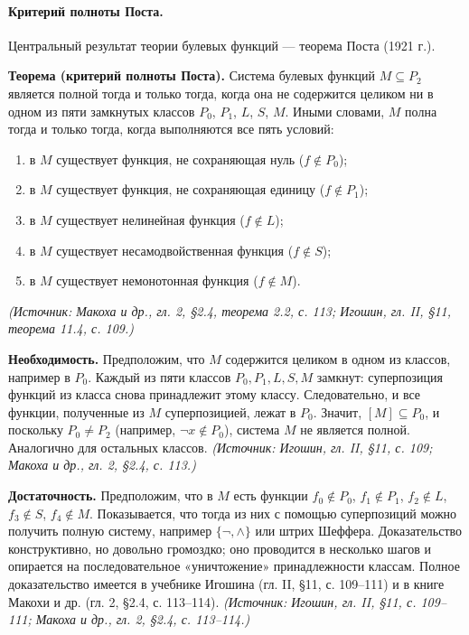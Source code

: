 \documentclass[a4paper,12pt]{article}
\begin{document}
\paragraph{Критерий полноты Поста.}
Центральный результат теории булевых функций — теорема Поста (1921 г.).

\textbf{Теорема (критерий полноты Поста).} Система булевых функций \(M\subseteq P_2\) является полной тогда и только тогда, когда она не содержится целиком ни в одном из пяти замкнутых классов \(P_0\), \(P_1\), \(L\), \(S\), \(M\). Иными словами, \(M\) полна тогда и только тогда, когда выполняются все пять условий:
\begin{enumerate}[label=\arabic*)]
\item в \(M\) существует функция, не сохраняющая нуль (\(f\notin P_0\));
\item в \(M\) существует функция, не сохраняющая единицу (\(f\notin P_1\));
\item в \(M\) существует нелинейная функция (\(f\notin L\));
\item в \(M\) существует несамодвойственная функция (\(f\notin S\));
\item в \(M\) существует немонотонная функция (\(f\notin M\)).
\end{enumerate}
\textit{(Источник: Макоха и др., гл. 2, §2.4, теорема 2.2, с. 113; Игошин, гл. II, §11, теорема 11.4, с. 109.)}

\textbf{Необходимость.} Предположим, что \(M\) содержится целиком в одном из классов, например в \(P_0\). Каждый из пяти классов \(P_0,P_1,L,S,M\) замкнут: суперпозиция функций из класса снова принадлежит этому классу. Следовательно, и все функции, полученные из \(M\) суперпозицией, лежат в \(P_0\). Значит, \([M]\subseteq P_0\), и поскольку \(P_0\ne P_2\) (например, \(\neg x\notin P_0\)), система \(M\) не является полной. Аналогично для остальных классов.
\textit{(Источник: Игошин, гл. II, §11, с. 109; Макоха и др., гл. 2, §2.4, с. 113.)}

\textbf{Достаточность.} Предположим, что в \(M\) есть функции \(f_0\notin P_0\), \(f_1\notin P_1\), \(f_2\notin L\), \(f_3\notin S\), \(f_4\notin M\). Показывается, что тогда из них с помощью суперпозиций можно получить полную систему, например \(\{\neg,\land\}\) или штрих Шеффера. Доказательство конструктивно, но довольно громоздко; оно проводится в несколько шагов и опирается на последовательное «уничтожение» принадлежности классам. Полное доказательство имеется в учебнике Игошина (гл. II, §11, с. 109--111) и в книге Макохи и др. (гл. 2, §2.4, с. 113--114).
\textit{(Источник: Игошин, гл. II, §11, с. 109--111; Макоха и др., гл. 2, §2.4, с. 113--114.)}
\end{document}
